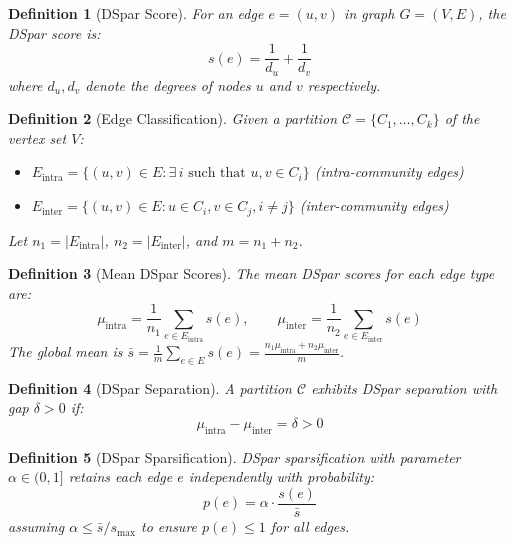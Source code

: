 \documentclass[10pt,journal,compsoc]{IEEEtran}
\newtheorem{definition}{Definition}
\begin{document}

\begin{definition}[DSpar Score]
For an edge $e = (u,v)$ in graph $G = (V, E)$, the \emph{DSpar score} is:
\begin{equation}
s(e) = \frac{1}{d_u} + \frac{1}{d_v}
\end{equation}
where $d_u, d_v$ denote the degrees of nodes $u$ and $v$ respectively.
\end{definition}

\begin{definition}[Edge Classification]
Given a partition $\mathcal{C} = \{C_1, \ldots, C_k\}$ of the vertex set $V$:
\begin{itemize}
    \item $E_{\text{intra}} = \{(u,v) \in E : \exists\, i \text{ such that } u, v \in C_i\}$ (intra-community edges)
    \item $E_{\text{inter}} = \{(u,v) \in E : u \in C_i, v \in C_j, i \neq j\}$ (inter-community edges)
\end{itemize}
Let $n_1 = |E_{\text{intra}}|$, $n_2 = |E_{\text{inter}}|$, and $m = n_1 + n_2$.
\end{definition}

\begin{definition}[Mean DSpar Scores]
The mean DSpar scores for each edge type are:
\begin{equation}
\mu_{\text{intra}} = \frac{1}{n_1} \sum_{e \in E_{\text{intra}}} s(e), \qquad
\mu_{\text{inter}} = \frac{1}{n_2} \sum_{e \in E_{\text{inter}}} s(e)
\end{equation}
The global mean is $\bar{s} = \frac{1}{m}\sum_{e \in E} s(e) = \frac{n_1 \mu_{\text{intra}} + n_2 \mu_{\text{inter}}}{m}$.
\end{definition}

\begin{definition}[DSpar Separation]
A partition $\mathcal{C}$ exhibits \emph{DSpar separation} with gap $\delta > 0$ if:
\begin{equation}
\mu_{\text{intra}} - \mu_{\text{inter}} = \delta > 0
\end{equation}
\end{definition}

\begin{definition}[DSpar Sparsification]
DSpar sparsification with parameter $\alpha \in (0,1]$ retains each edge $e$ independently with probability:
\begin{equation}
p(e) = \alpha \cdot \frac{s(e)}{\bar{s}}
\end{equation}
assuming $\alpha \leq \bar{s}/s_{\max}$ to ensure $p(e) \leq 1$ for all edges.
\end{definition}
\end{document}
